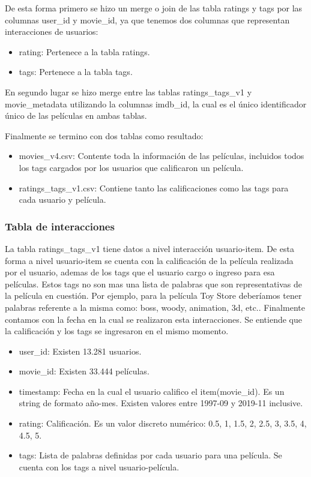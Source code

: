 \documentclass[11pt,a4paper,twoside]{thesis}
\begin{document}
De esta forma primero se hizo un merge o join de las tabla ratings y tags por las columnas user\_id y movie\_id,
 ya que tenemos dos columnas que representan interacciones de usuarios: 

\begin{itemize}
	\item rating: Pertenece a la tabla ratings.
	\item tags: Pertenece a la tabla tags.
\end{itemize}

En segundo lugar se hizo merge entre las tablas ratings\_tags\_v1 y movie\_metadata utilizando la columnas imdb\_id, la cual es el único 
identificador único de las películas en ambas tablas.

Finalmente se termino con dos tablas como resultado:

\begin{itemize}
	\item movies\_v4.csv: Contente toda la información de las películas, incluidos todos los tags cargados por los usuarios que calificaron un película.
	\item ratings\_tags\_v1.csv: Contiene tanto las calificaciones como las tags para cada usuario y película. 
\end{itemize}

\subsubsection{Tabla de interacciones}

La tabla ratings\_tags\_v1 tiene datos a nivel interacción usuario-item. De esta forma a nivel usuario-item se cuenta con la 
calificación de la película realizada por el usuario, ademas de los tags que el usuario cargo o ingreso para 
esa películas. Estos tags no son mas una lista de palabras que son representativas de la película en cuestión. 
Por ejemplo, para la película Toy Store deberíamos tener palabras referente a la misma como: boss, woody, 
animation, 3d, etc.. Finalmente contamos con la fecha en la cual se realizaron esta interacciones. Se entiende 
que la calificación y los tags se ingresaron en el mismo momento.


\begin{itemize}
	\item user\_id:  Existen 13.281 usuarios.
	\item movie\_id: Existen 33.444 películas.
	\item timestamp: Fecha en la cual el usuario califico el item(movie\_id). Es un string de formato año-mes. Existen valores entre 1997-09 y 2019-11 inclusive.
	\item rating:    Calificación. Es un valor discreto numérico: 0.5, 1, 1.5, 2, 2.5, 3, 3.5, 4, 4.5, 5.
	\item tags:      Lista de palabras definidas por cada usuario para una película. Se cuenta con los tags a nivel usuario-película.
\end{itemize}
\end{document}
